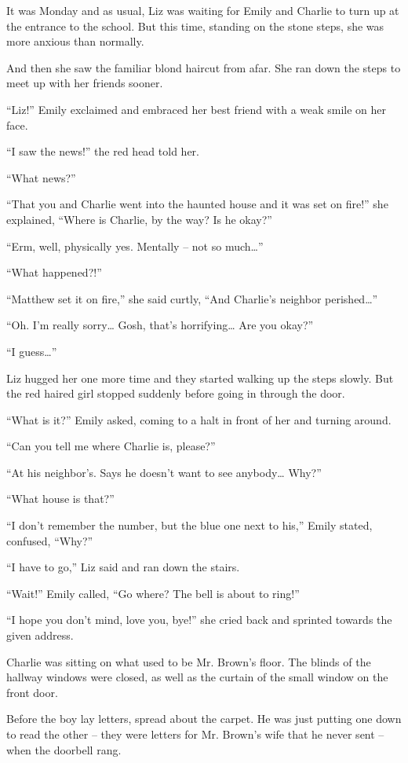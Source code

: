 It was Monday and as usual, Liz was waiting for Emily and Charlie to turn up at the entrance to the school. But this time, standing on the stone steps, she was more anxious than normally.

And then she saw the familiar blond haircut from afar. She ran down the steps to meet up with her friends sooner.

“Liz!” Emily exclaimed and embraced her best friend with a weak smile on her face.

“I saw the news!” the red head told her.

“What news?”

“That you and Charlie went into the haunted house and it was set on fire!” she explained, “Where is Charlie, by the way? Is he okay?”

“Erm, well, physically yes. Mentally – not so much…”

“What happened?!”

“Matthew set it on fire,” she said curtly, “And Charlie's neighbor perished…”

“Oh. I'm really sorry… Gosh, that's horrifying… Are you okay?”

“I guess…”

Liz hugged her one more time and they started walking up the steps slowly. But the red haired girl stopped suddenly before going in through the door.

“What is it?” Emily asked, coming to a halt in front of her and turning around.

“Can you tell me where Charlie is, please?”

“At his neighbor's. Says he doesn't want to see anybody… Why?”

“What house is that?”

“I don't remember the number, but the blue one next to his,” Emily stated, confused, “Why?”

“I have to go,” Liz said and ran down the stairs.

“Wait!” Emily called, “Go where? The bell is about to ring!”

“I hope you don't mind, love you, bye!” she cried back and sprinted towards the given address.

\bigskip

Charlie was sitting on what used to be Mr. Brown's floor. The blinds of the hallway windows were closed, as well as the curtain of the small window on the front door.

Before the boy lay letters, spread about the carpet. He was just putting one down to read the other – they were letters for Mr. Brown's wife that he never sent – when the doorbell rang.

